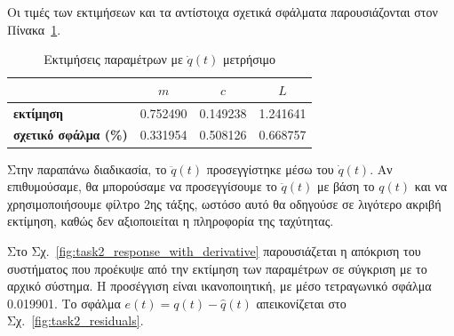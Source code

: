 \documentclass[a4paper,12pt]{article}
\begin{document}
Οι τιμές των εκτιμήσεων και τα αντίστοιχα σχετικά σφάλματα παρουσιάζονται στον Πίνακα~\ref{tab:task2_estimations_with_derivative}.

\begin{table}[h!]
\centering
\begin{tabular}{|l|c|c|c|}
\hline
\multicolumn{1}{|c|}{} & \multicolumn{1}{c|}{$m$} & \multicolumn{1}{c|}{$c$} & \multicolumn{1}{c|}{$L$} \\
\hline
\textbf{εκτίμηση} & 0.752490 & 0.149238 & 1.241641 \\
\textbf{σχετικό σφάλμα (\%)} & 0.331954 & 0.508126 & 0.668757 \\
\hline
\end{tabular}
\caption{Εκτιμήσεις παραμέτρων με $\dot{q}(t)$ μετρήσιμο}
\label{tab:task2_estimations_with_derivative}
\end{table}

Στην παραπάνω διαδικασία, το $\ddot{q}(t)$ προσεγγίστηκε μέσω του $\dot{q}(t)$. Αν επιθυμούσαμε, θα μπορούσαμε να προσεγγίσουμε το $\ddot{q}(t)$ με βάση το $q(t)$ και να χρησιμοποιήσουμε φίλτρο 2ης τάξης, ωστόσο αυτό θα οδηγούσε σε λιγότερο ακριβή εκτίμηση, καθώς δεν αξιοποιείται η πληροφορία της ταχύτητας.

Στο Σχ.~\ref{fig:task2_response_with_derivative} παρουσιάζεται η απόκριση του συστήματος που προέκυψε από την εκτίμηση των παραμέτρων σε σύγκριση με το αρχικό σύστημα. Η προσέγγιση είναι ικανοποιητική, με μέσο τετραγωνικό σφάλμα 0.019901. Το σφάλμα $e(t) = q(t) - \hat{q}(t)$ απεικονίζεται στο Σχ.~\ref{fig:task2_residuals}.
\end{document}

